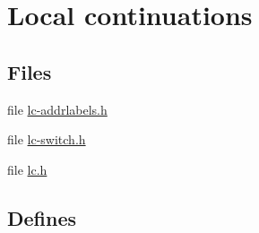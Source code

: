 \hypertarget{group__lc}{
\section{Local continuations}
\label{group__lc}
}
\subsection*{Files}
\begin{DoxyCompactItemize}
\item 
file \hyperlink{lc-addrlabels_8h}{lc-\/addrlabels.h}
\item 
file \hyperlink{lc-switch_8h}{lc-\/switch.h}
\item 
file \hyperlink{lc_8h}{lc.h}
\end{DoxyCompactItemize}
\subsection*{Defines}

